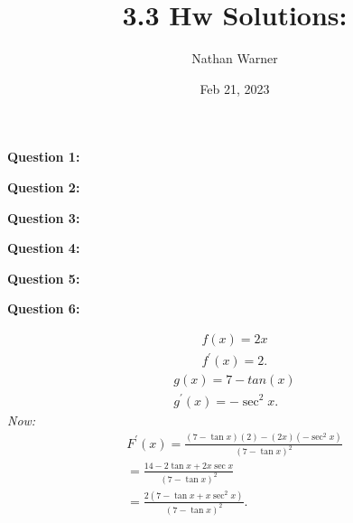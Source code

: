 \documentclass{report}
\title{\Huge{3.3 Hw Solutions:}}
\author{\huge{Nathan Warner}}
\date{\huge{Feb 21, 2023}}
\begin{document}
    \maketitle
    \begin{Large}
        \noindent \textbf{Question 1:}
    \end{Large}
    \bigbreak \noindent 
    \bigbreak \noindent 

    \bigbreak \noindent \bigbreak \noindent 
    \begin{Large}
        \textbf{Question 2:}
    \end{Large}
    \bigbreak \noindent 
    \bigbreak \noindent 

    \bigbreak \noindent \bigbreak \noindent 
    \begin{Large}
        \textbf{Question 3:}
    \end{Large}
    \bigbreak \noindent 
    \bigbreak \noindent 


    \bigbreak \noindent \bigbreak \noindent 
    \begin{Large}
        \textbf{Question 4:}
    \end{Large}
    \bigbreak \noindent 
    \bigbreak \noindent 

    \bigbreak \noindent \bigbreak \noindent 
    \begin{Large}
        \textbf{Question 5:}
    \end{Large}
    \bigbreak \noindent 
    \bigbreak \noindent 

    \bigbreak \noindent \bigbreak \noindent 
    \begin{Large}
        \textbf{Question 6:}
    \end{Large}
    \bigbreak \noindent 
    \bigbreak \noindent 
    \begin{align*}
        f(x)= 2x \\
        f^{\prime}(x) = 2
    .\end{align*}
    \begin{align*}
        g(x) = 7-tan(x) \\
        g^{\prime}(x) = -\sec^2{x}
    .\end{align*}
    \bigbreak \noindent 
    \textit{Now:}
    \begin{align*}
        F^{\prime}(x) = \frac{(7-\tan{x})(2) - (2x)(-\sec^{2}{x})}{(7-\tan{x})^2} \\
        = \frac{14-2\tan{x}+2x\sec{x}}{(7-\tan{x})^2} \\ 
        = \frac{2(7-\tan{x}+x\sec^{2}{x})}{(7-\tan{x})^2}
    .\end{align*}
    
\end{document}
